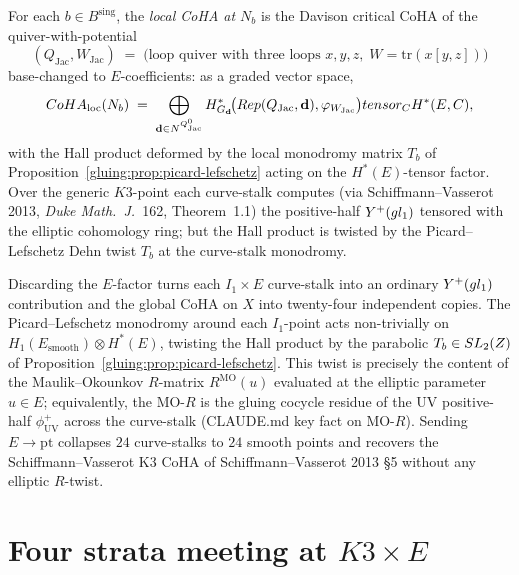 \begin{definition}
\label{gluing:def:local-CoHA-curve-stalk}
For each $b \in B^{\mathrm{sing}}$, the \emph{local CoHA at $N_b$} is
the Davison critical CoHA of the quiver-with-potential
\[
 (Q_{\text{Jac}}, W_{\text{Jac}}) \;=\; \bigl(\text{loop quiver with
 three loops } x, y, z,\; W = \mathrm{tr}(x[y, z])\bigr)
\]
base-changed to $E$-coefficients: as a graded vector space,
\[
 CoHA_{\text{loc}}(N_b) \;=\;
 \bigoplus_{\mathbf d \in N^{Q_{\text{Jac}}^0}}
 H^*_{G_{\mathbf d}}\!\bigl(Rep(Q_{\text{Jac}}, \mathbf d),
 \varphi_{W_{\text{Jac}}}\bigr) tensor_{C} H^*(E, C),
\]
with the Hall product deformed by the local monodromy matrix $T_b$ of
Proposition~\ref{gluing:prop:picard-lefschetz} acting on the $H^*(E)$-tensor
factor. Over the generic $K3$-point each curve-stalk computes (via
Schiffmann--Vasserot 2013, \emph{Duke Math.\ J.}~162, Theorem~1.1)
the positive-half $Y^{+}(gl_1)$ tensored with the
elliptic cohomology ring; but the Hall product is twisted by the
Picard--Lefschetz Dehn twist $T_b$ at the curve-stalk monodromy.
\end{definition}

\begin{remark}
\label{gluing:rem:elliptic-tensor-non-trivial}
Discarding the $E$-factor turns each $I_1 \times E$ curve-stalk
into an ordinary $Y^{+}(gl_1)$ contribution and the
global CoHA on $X$ into twenty-four independent copies. The
Picard--Lefschetz monodromy around each $I_1$-point acts non-trivially
on $H_1(E_{\text{smooth}}) \otimes H^*(E)$, twisting the Hall product
by the parabolic $T_b \in SL_2(Z)$ of
Proposition~\ref{gluing:prop:picard-lefschetz}. This twist is precisely the
content of the Maulik--Okounkov $R$-matrix $R^{\mathrm{MO}}(u)$
evaluated at the elliptic parameter $u \in E$; equivalently, the
MO-$R$ is the gluing cocycle residue of the UV positive-half
$\phi^+_{\mathrm{UV}}$ across the curve-stalk (CLAUDE.md key fact on
MO-$R$). Sending $E \to \mathrm{pt}$ collapses $24$ curve-stalks
to $24$ smooth points and recovers the Schiffmann--Vasserot K3 CoHA of
Schiffmann--Vasserot 2013 \S 5 without any elliptic $R$-twist.
\end{remark}

\section{Four strata meeting at $K3 \times E$}
\label{gluing:sec:k3xe-four-stratum}

